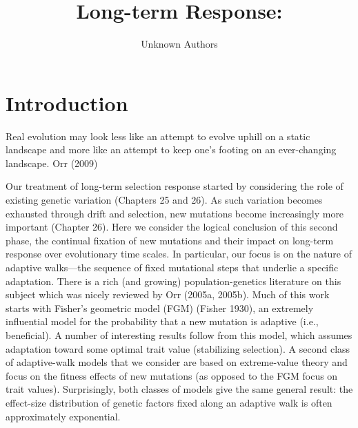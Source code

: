 \documentclass{article}
\title{Long-term Response:}
\author{Unknown Authors}
\date{}
\begin{document}
\maketitle

\begin{abstract}

\end{abstract}

\section{Introduction}
Real evolution may look less like an attempt to evolve uphill on a static landscape and more like an attempt to keep one's footing on an ever-changing landscape.
Orr (2009)

Our treatment of long-term selection response started by considering the role of existing genetic variation (Chapters 25 and 26). As such variation becomes exhausted through drift and selection, new mutations become increasingly more important (Chapter 26). Here we consider the logical conclusion of this second phase, the continual fixation of new mutations and their impact on long-term response over evolutionary time scales. In particular, our focus is on the nature of adaptive walks—the sequence of fixed mutational steps that underlie a specific adaptation. There is a rich (and growing) population-genetics literature on this subject which was nicely reviewed by Orr (2005a, 2005b). Much of this work starts with Fisher's geometric model (FGM) (Fisher 1930), an extremely influential model for the probability that a new mutation is adaptive (i.e., beneficial). A number of interesting results follow from this model, which assumes adaptation toward some optimal trait value (stabilizing selection). A second class of adaptive-walk models that we consider are based on extreme-value theory and focus on the fitness effects of new mutations (as opposed to the FGM focus on trait values). Surprisingly, both classes of models give the same general result: the effect-size distribution of genetic factors fixed along an adaptive walk is often approximately exponential.
\end{document}
